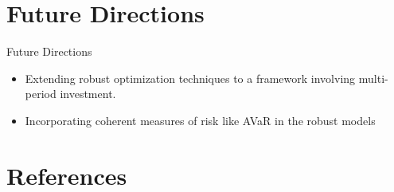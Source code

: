 \documentclass{beamer}
\begin{document}
\section{Future Directions}

\begin{frame}{Future Directions}
\begin{itemize}
    \item Extending robust optimization techniques to a framework involving multi-period investment.
    \item Incorporating coherent measures of risk like AVaR in the robust models
\end{itemize}
\end{frame}




















\section{References}
\end{document}
